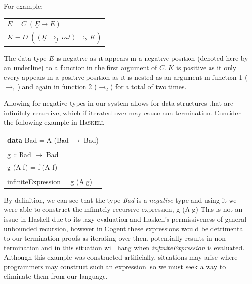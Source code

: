 For example:

\begin{center}
    \begin{tabular}{l}
        $E = C\; (\underline{E} \rightarrow E)$ \\
        $K = D\; (\underline{(\underline{K} \rightarrow_1 Int)} \rightarrow_2 K)$
    \end{tabular} 
\end{center}

The data type $E$ is negative as it appears in a negative position (denoted here by an underline)
to a function in the first argument of $C$.
$K$ is positive as it only every appears in a positive position as it is nested as an argument
in function 1 ($\rightarrow_1$) and again in function 2 ($\rightarrow_2$) for a total of two times.

Allowing for negative types in our system allows for data structures that are infinitely recursive,
which if iterated over may cause non-termination. Consider the following example in \textsc{Haskell}:

\begin{center}
    \begin{tabular}{l}
            \textbf{data} \textsf{Bad = A (Bad $\rightarrow$ Bad)} \\ \\

            \textsf{g :: Bad $\rightarrow$ Bad} \\
            \textsf{g (A f) = f (A f)} \\ \\

            \textsf{infiniteExpression = g (A g)}
    \end{tabular} 
\end{center}

By definition, we can see that the type \textit{Bad} is a \textit{negative} type and using it we were able
to construct the infinitely recursive expression, \textsf{g (A g)}
This is not an issue in Haskell due to its lazy evaluation and  Haskell's permissiveness of general unbounded recursion,
however in Cogent these expressions would be detrimental to our termination
proofs as iterating over them potentially results in non-termination and in this
situation will hang when \textit{infiniteExpression} is evaluated.
Although this example was constructed artificially, situations may arise where
programmers may construct such an expression, so we must seek a way to
eliminate them from our language.

